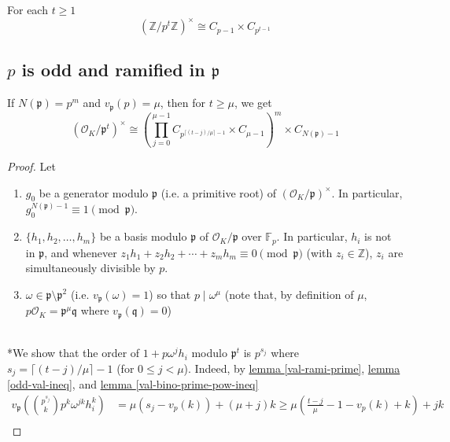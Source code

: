 \documentclass{treatise}
\begin{document}
\begin{corollary}
For each $t \geq 1$
$$(\mathbb{Z}/p^t \mathbb{Z})^\times \cong C_{p - 1} \times C_{p^{t - 1}}$$
\end{corollary}

\begin{shaded}
\subsection{$p$ is odd and ramified in $\mathfrak{p}$}
\begin{theorem}
If $N(\mathfrak{p}) = p^m$ and $v_\mathfrak{p}(p) = \mu$, then for $t \geq \mu$, we get
$$(\mathcal{O}_K / \mathfrak{p}^t)^\times \cong \left( \prod_{j = 0}^{\mu - 1} C_{p^{\lceil (t - j)/\mu \rceil - 1}} \times C_{\mu - 1} \right)^m \times C_{N(\mathfrak{p}) - 1}$$
\end{theorem}
\begin{proof}
Let
\begin{enumerate}
	\item $g_0$ be a generator modulo $\mathfrak{p}$ (i.e. a primitive root) of $(\mathcal{O}_K / \mathfrak{p})^\times$. In particular, $g_0^{N(\mathfrak{p}) - 1} \equiv 1 \pmod{\mathfrak{p}}$.
	\item $\{ h_1, h_2, \hdots, h_m \}$ be a basis modulo $\mathfrak{p}$ of $\mathcal{O}_K / \mathfrak{p}$ over $\mathbb{F}_p$. In particular, $h_i$ is not in $\mathfrak{p}$, and whenever $z_1 h_1 + z_2 h_2 + \cdots + z_m h_m \equiv 0 \pmod{\mathfrak{p}}$ (with $z_i \in \mathbb{Z}$), $z_i$ are simultaneously divisible by $p$.
	\item $\omega \in \mathfrak{p} \setminus \mathfrak{p}^2$ (i.e. $v_\mathfrak{p}(\omega) = 1$) so that $p \mid \omega^\mu$ (note that, by definition of $\mu$, $p \mathcal{O}_K = \mathfrak{p}^\mu \mathfrak{q}$ where $v_\mathfrak{p}(\mathfrak{q}) = 0$)
\end{enumerate}
\ \\
*We show that the order of $1 + p \omega^j h_i$ modulo $\mathfrak{p}^t$ is $p^{s_j}$ where $s_j = \lceil (t - j)/\mu \rceil - 1$ (for $0 \leq j < \mu$). Indeed, by \hyperref[val-rami-prime]{lemma \ref*{val-rami-prime}}, \hyperref[odd-val-ineq]{lemma \ref*{odd-val-ineq}}, and \hyperref[val-bino-prime-pow-ineq]{lemma \ref*{val-bino-prime-pow-ineq}}
\begin{align*}
v_\mathfrak{p} \left( {p^{s_j} \choose k} p^k \omega^{jk} h_i^k \right) & = \mu (s_j - v_p(k)) + (\mu + j)k \geq \mu \left( \frac{t - j}{\mu} - 1 - v_p(k) + k \right) + jk \\

\end{align*}
\end{proof}
\end{shaded}
\end{document}
